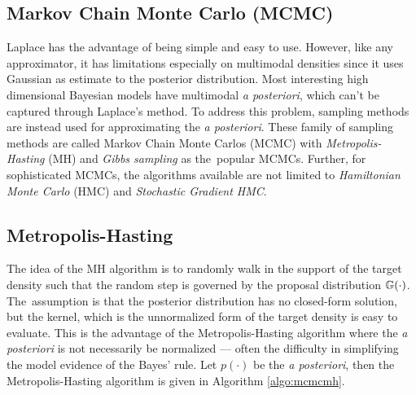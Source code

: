 \subsection{Markov Chain Monte Carlo (MCMC)}
Laplace has the advantage of being simple and easy to use. However, like any approximator, it has limitations especially on multimodal densities since it uses Gaussian as estimate to the posterior distribution. Most interesting high dimensional Bayesian models have multimodal \textit{a posteriori}, which can't be captured through Laplace's method. To address this problem, sampling methods are instead used for approximating the \textit{a posteriori}. These family of sampling methods are called Markov Chain Monte Carlos (MCMC) with \textit{Metropolis-Hasting} (MH) and \textit{Gibbs sampling} as \mbox{the popular} MCMCs. Further, for sophisticated MCMCs, the algorithms available are not limited to \textit{Hamiltonian Monte Carlo} (HMC) and \textit{Stochastic Gradient HMC}.
\subsection{Metropolis-Hasting}\label{sec:metropolishasting}
The idea of the MH algorithm is to randomly walk in the support of the target density such that the random step is governed by the proposal distribution $\mathbb{G}(\cdot)$. \mbox{The assumption} is that the posterior distribution has no closed-form solution, but the kernel, which is the unnormalized form of the target density is easy to evaluate. This is the advantage of the Metropolis-Hasting algorithm where the \textit{a posteriori} is not necessarily be normalized --- often the difficulty in simplifying the model evidence of the Bayes' rule. Let $ p(\cdot)$ be the \textit{a posteriori}, then the Metropolis-Hasting algorithm is given in Algorithm \ref{algo:mcmcmh}.
\vspace{.4cm}

